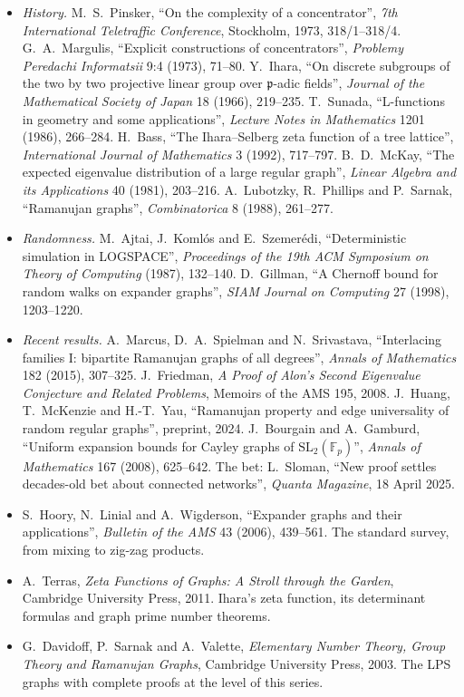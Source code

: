 \begin{itemize}
\item \emph{History.} M.~S.~Pinsker, ``On the complexity of a concentrator'', \emph{7th International Teletraffic Conference}, Stockholm, 1973, 318/1--318/4. G.~A.~Margulis, ``Explicit constructions of concentrators'', \emph{Problemy
Peredachi Informatsii} 9:4 (1973), 71--80. Y.~Ihara, ``On discrete subgroups of the two by two projective linear group over $\mathfrak p$-adic fields'', \emph{Journal of the Mathematical Society of Japan} 18 (1966), 219--235.
T.~Sunada, ``L-functions in geometry and some applications'', \emph{Lecture Notes in Mathematics} 1201 (1986), 266--284. H.~Bass, ``The Ihara--Selberg zeta function of a tree lattice'', \emph{International Journal of Mathematics} 3
(1992), 717--797. B.~D.~McKay, ``The expected eigenvalue distribution of a large regular graph'', \emph{Linear Algebra and its Applications} 40 (1981), 203--216. A.~Lubotzky, R.~Phillips and P.~Sarnak, ``Ramanujan graphs'',
\emph{Combinatorica} 8 (1988), 261--277.
\item \emph{Randomness.} M.~Ajtai, J.~Koml\'os and E.~Szemer\'edi, ``Deterministic simulation in LOGSPACE'', \emph{Proceedings of the 19th ACM Symposium on Theory of Computing} (1987), 132--140. D.~Gillman, ``A Chernoff bound for
random walks on expander graphs'', \emph{SIAM Journal on Computing} 27 (1998), 1203--1220.
\item \emph{Recent results.} A.~Marcus, D.~A.~Spielman and N.~Srivastava, ``Interlacing families I: bipartite Ramanujan graphs of all degrees'', \emph{Annals of Mathematics} 182 (2015), 307--325. J.~Friedman, \emph{A Proof of Alon's
Second Eigenvalue Conjecture and Related Problems}, Memoirs of the AMS 195, 2008. J.~Huang, T.~McKenzie and H.-T.~Yau, ``Ramanujan property and edge universality of random regular graphs'', preprint, 2024.
J.~Bourgain and A.~Gamburd, ``Uniform expansion bounds for Cayley graphs of $\mathrm{SL}_2(\mathbb F_p)$'', \emph{Annals of Mathematics} 167 (2008), 625--642. The bet: L.~Sloman, ``New proof settles decades-old bet
about connected networks'', \emph{Quanta Magazine}, 18 April 2025.
\item S.~Hoory, N.~Linial and A.~Wigderson, ``Expander graphs and their applications'', \emph{Bulletin of the AMS} 43 (2006), 439--561. The standard survey, from mixing to zig-zag products.
\item A.~Terras, \emph{Zeta Functions of Graphs: A Stroll through the Garden}, Cambridge University Press, 2011. Ihara's zeta function, its determinant formulas and graph prime number theorems.
\item G.~Davidoff, P.~Sarnak and A.~Valette, \emph{Elementary Number Theory, Group Theory and Ramanujan Graphs}, Cambridge University Press, 2003. The LPS graphs with complete proofs at the level of this series.
\end{itemize}
